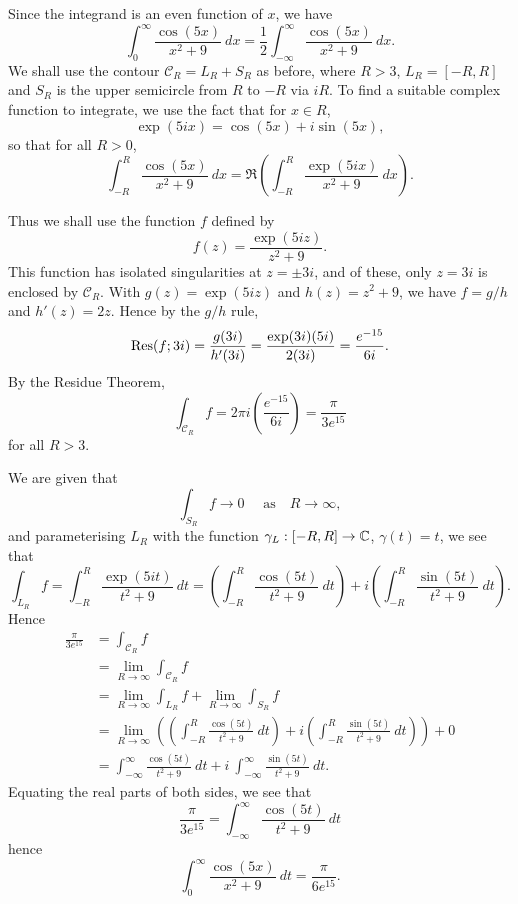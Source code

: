 \begin{solution}
Since the integrand is an even function of $x$, we have
\[
\int_{0}^{\infty} \frac{\cos(5x)}{x^2+9}\ dx = \frac{1}{2} \int_{-\infty}^{\infty} \frac{\cos(5x)}{x^2+9}\ dx.
\]
We shall use the contour $\mathcal{C}_R = L_R+S_R$ as before, where $R>3$, $L_R=[-R,R]$ and $S_R$ is the upper semicircle from $R$ to $-R$ via $iR$.  To find a suitable complex function to integrate, we use the fact that for $x \in R$,
\[
\exp(5ix) = \cos(5x) + i \sin (5x),
\]
so that for all $R>0$,
\[
\int_{-R}^{R} \frac{\cos(5x)}{x^2+9}\ dx = \Re \left(\int_{-R}^R \frac{\exp(5ix)}{x^2+9}\ dx \right).
\]

Thus we shall use the function $f$ defined by
\[
f(z) = \frac{\exp(5iz)}{z^2+9}.
\]
This function has isolated singularities at $z=\pm 3i$, and of these, only $z=3i$ is enclosed by $\mathcal{C}_R$.  With $g(z) = \exp(5iz)$ and $h(z)=z^2+9$, we have $f=g/h$ and $h'(z)=2z$.  Hence by the $g/h$ rule,
\[
\mathrm{Res} (f;3i) = \frac{g(3i)}{h'(3i)} = \frac{\exp(3i)(5i)}{2(3i)} = \frac{e^{-15}}{6i}.
\]
By the Residue Theorem,
\[
\int_{\mathcal{C}_R} f = 2\pi i \left( \frac{e^{-15}}{6i} \right) = \frac{\pi}{3e^{15}}
\]
for all $R>3$.

We are given that 
\[
\int_{S_R} f \to 0 \quad\text{ as}\quad R \to \infty,
\]
and parameterising $L_R$ with the function $\gamma_L:[-R,R] \to \mathbb{C}$, $\gamma(t)=t$, we see that
\[
\int_{L_R} f = \int_{-R}^R \frac{\exp(5it)}{t^2+9}\ dt = \left(\int_{-R}^R \frac{\cos(5t)}{t^2+9}\ dt\right) + i \left( \int_{-R}^R \frac{\sin(5t)}{t^2+9}\ dt \right).
\]
Hence
\begin{align*}
\frac{\pi}{3e^{15}} & = \int_{\mathcal{C}_R} f \\
& = \lim_{R \to \infty} \int_{\mathcal{C}_R} f \\
& = \lim_{R \to \infty} \int_{L_R} f + \lim_{R \to \infty} \int_{S_R} f \\
& = \lim_{R \to \infty} \left( \left(\int_{-R}^R \frac{\cos(5t)}{t^2+9}\ dt\right) + i \left( \int_{-R}^R \frac{\sin(5t)}{t^2+9}\ dt \right) \right) + 0 \\
& = \int_{-\infty}^{\infty} \frac{\cos(5t)}{t^2+9}\ dt + i\ \int_{-\infty}^{\infty} \frac{\sin(5t)}{t^2+9}\ dt.
\end{align*}
Equating the real  parts of both sides, we see that
\[
\frac{\pi}{3e^{15}} = \int_{-\infty}^{\infty} \frac{\cos(5t)}{t^2+9}\ dt
\]
hence
\[
\int_0^{\infty} \frac{\cos(5x)}{x^2+9}\ dt = \frac{\pi}{6e^{15}}.
\]
\end{solution}

